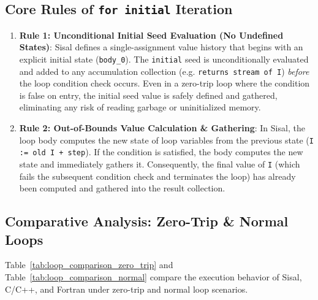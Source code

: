 \subsection{Core Rules of \texttt{for initial} Iteration}
\begin{enumerate}
    \item \textbf{Rule 1: Unconditional Initial Seed Evaluation (No Undefined States)}:
    Sisal defines a single-assignment value history that begins with an explicit initial state (\texttt{body\_0}). The \texttt{initial} seed is unconditionally evaluated and added to any accumulation collection (e.g. \texttt{returns stream of I}) \emph{before} the loop condition check occurs. Even in a zero-trip loop where the condition is false on entry, the initial seed value is safely defined and gathered, eliminating any risk of reading garbage or uninitialized memory.
    
    \item \textbf{Rule 2: Out-of-Bounds Value Calculation \& Gathering}:
    In Sisal, the loop body computes the new state of loop variables from the previous state (\texttt{I := old I + step}). If the condition is satisfied, the body computes the new state and immediately gathers it. Consequently, the final value of \texttt{I} (which fails the subsequent condition check and terminates the loop) has already been computed and gathered into the result collection.
\end{enumerate}

\subsection{Comparative Analysis: Zero-Trip \& Normal Loops}
Table~\ref{tab:loop_comparison_zero_trip} and Table~\ref{tab:loop_comparison_normal} compare the execution behavior of Sisal, C/C++, and Fortran under zero-trip and normal loop scenarios.

